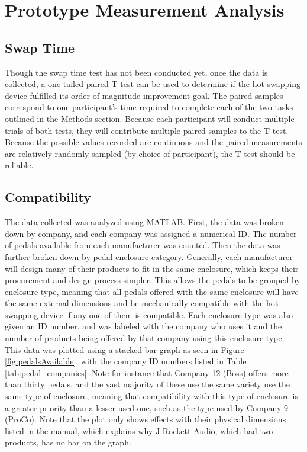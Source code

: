 \documentclass{article}
\begin{document}
\section{Prototype Measurement Analysis}
	\subsection{Swap Time}
	Though the swap time test has not been conducted yet, once the data is collected, a one tailed paired T-test can be used to determine if the hot swapping device fulfilled its order of magnitude improvement goal.  The paired samples correspond to one participant's time required to complete each of the two tasks outlined in the Methods section.  Because each participant will conduct multiple trials of both tests, they will contribute multiple paired samples to the T-test.  Because the possible values recorded are continuous and the paired measurements are relatively randomly sampled (by choice of participant), the T-test should be reliable.

	\subsection{Compatibility}
	The data collected was analyzed using MATLAB.  First, the data was broken down by company, and each company was assigned a numerical ID.  The number of pedals available from each manufacturer was counted.  Then the data was further broken down by pedal enclosure category.  Generally, each manufacturer will design many of their products to fit in the same enclosure, which keeps their procurement and design process simpler.  This allows the pedals to be grouped by enclosure type, meaning that all pedals offered with the same enclosure will have the same external dimensions and be mechanically compatible with the hot swapping device if any one of them is compatible.  Each enclosure type was also given an ID number, and was labeled with the company who uses it and the number of products being offered by that company using this enclosure type.  This data was plotted using a stacked bar graph as seen in Figure \ref{fig:pedalsAvailable}, with the company ID numbers listed in Table \ref{tab:pedal_companies}.  Note for instance that Company 12 (Boss) offers more than thirty pedals, and the vast majority of these use the same variety use the same type of enclosure, meaning that compatibility with this type of enclosure is a greater priority than a lesser used one, such as the type used by Company 9 (ProCo).  Note that the plot only shows effects with their physical dimensions listed in the manual, which explains why J Rockett Audio, which had two products, has no bar on the graph.
\end{document}
